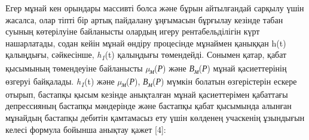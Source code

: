     \begin{multicols}{2}

Егер мұнай кен орындары массивті болса және бұрын айтылғандай сарқылу
үшін жасалса, олар тіпті бір артық пайдалану ұңғымасын бұрғылау кезінде
табан суының көтерілуіне байланысты олардың игеру рентабельділігін күрт
нашарлатады, содан кейін мұнай өндіру процесінде мұнаймен қаныққан h(t)
қалыңдығы, сәйкесінше, \emph{h\textsubscript{1}}(t) қалыңдығы
төмендейді. Сонымен қатар, қабат қысымының төмендеуіне байланысты
\emph{µ\textsubscript{м}}(\emph{Р}) және
\emph{В\textsubscript{м}}(\emph{Р}) мұнай қасиеттерінің өзгеруі
байқалады. \emph{h\textsubscript{1}}(t) және
\emph{µ\textsubscript{м}}(\emph{Р}), \emph{В\textsubscript{м}}(\emph{Р})
мүмкін болатын өзгерістерін ескере отырып, бастапқы қысым кезінде
анықталған мұнай қасиеттерімен қабаттағы депрессияның бастапқы
мәндерінде және бастапқы қабат қысымында алынған мұнайдың бастапқы
дебитін қамтамасыз ету үшін көлденең учаскенің ұзындығын келесі формула
бойынша анықтау қажет {[}4{]}:
\end{multicols}


